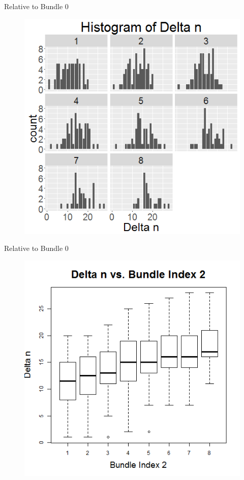 \documentclass[xcolor=dvipsnames,11pt]{beamer}
\theoremstyle{definition}
\begin{document}
\begin{frame}{Relative to Bundle 0}
\begin{figure}
\graphicspath{ {../../0_relative_to_bundle_0/} }
\includegraphics[scale=0.43]{1_z_histogram_of_delta_n_rel_to_b0_in_num_of_acc_relerent_bundle_index_rel_to_b0}
\end{figure}
\end{frame}

\begin{frame}{Relative to Bundle 0}
\begin{figure}
\graphicspath{ {../../0_relative_to_bundle_0/} }
\includegraphics[scale=0.43]{2_boxplot_delta_n_bundle_index_rel_to_b0}
\end{figure}
\end{frame}
\end{document}
